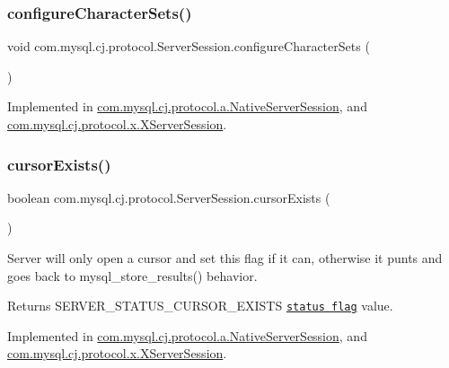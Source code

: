 \subsubsection{\texorpdfstring{configure\+Character\+Sets()}{configureCharacterSets()}}
{\footnotesize\ttfamily void com.\+mysql.\+cj.\+protocol.\+Server\+Session.\+configure\+Character\+Sets (\begin{DoxyParamCaption}{ }\end{DoxyParamCaption})}



Implemented in \mbox{\hyperlink{classcom_1_1mysql_1_1cj_1_1protocol_1_1a_1_1_native_server_session_afb85710d7264a784f27133cec2eaf811}{com.\+mysql.\+cj.\+protocol.\+a.\+Native\+Server\+Session}}, and \mbox{\hyperlink{classcom_1_1mysql_1_1cj_1_1protocol_1_1x_1_1_x_server_session_a260688fd1a089273e598fb0e95a066b7}{com.\+mysql.\+cj.\+protocol.\+x.\+X\+Server\+Session}}.

\mbox{\label{interfacecom_1_1mysql_1_1cj_1_1protocol_1_1_server_session_aee37dfcad7c37e0b031da85b7f638435}} 
\subsubsection{\texorpdfstring{cursor\+Exists()}{cursorExists()}}
{\footnotesize\ttfamily boolean com.\+mysql.\+cj.\+protocol.\+Server\+Session.\+cursor\+Exists (\begin{DoxyParamCaption}{ }\end{DoxyParamCaption})}

Server will only open a cursor and set this flag if it can, otherwise it punts and goes back to mysql\+\_\+store\+\_\+results() behavior.

\begin{DoxyReturn}{Returns}
S\+E\+R\+V\+E\+R\+\_\+\+S\+T\+A\+T\+U\+S\+\_\+\+C\+U\+R\+S\+O\+R\+\_\+\+E\+X\+I\+S\+TS \href{http://dev.mysql.com/doc/internals/en/status-flags.html}{\tt status flag} value. 
\end{DoxyReturn}


Implemented in \mbox{\hyperlink{classcom_1_1mysql_1_1cj_1_1protocol_1_1a_1_1_native_server_session_a9e04d0827dc182b812bde510a82952c1}{com.\+mysql.\+cj.\+protocol.\+a.\+Native\+Server\+Session}}, and \mbox{\hyperlink{classcom_1_1mysql_1_1cj_1_1protocol_1_1x_1_1_x_server_session_a4631fd33459ee83b06f167ba96e9218a}{com.\+mysql.\+cj.\+protocol.\+x.\+X\+Server\+Session}}.


